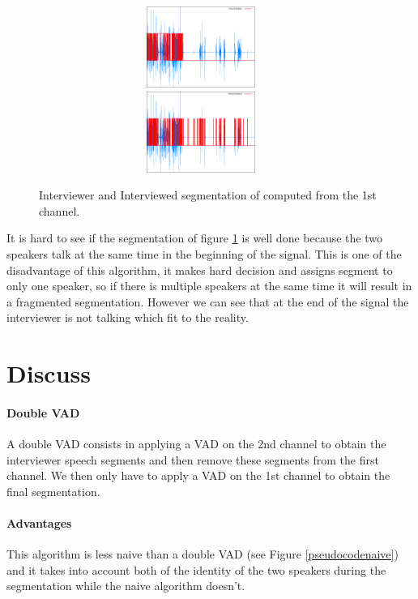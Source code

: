 \documentclass{techrep} %
\begin{document}
\begin{figure}[H]
  \centering \includegraphics[width=400px,height=100px]{interviewer}
  \centering \includegraphics[width=400px,height=100px]{interviewed}
  \caption{Interviewer and Interviewed segmentation of computed from the 1st channel.}
  \label{sigc2}
\end{figure}

It is hard to see if the segmentation of figure \ref{sigc2} is well
done because the two speakers talk at the same time in the beginning
of the signal. This is one of the disadvantage of this algorithm, it
makes hard decision and assigns segment to only one speaker, so if
there is multiple speakers at the same time it will result in a
fragmented segmentation. However we can see that at the end of the signal
the interviewer is not talking which fit to the reality.

\section{Discuss}

\paragraph{Double VAD}
A double VAD consists in applying a VAD on the 2nd channel to obtain
the interviewer speech segments and then remove these segments from
the first channel. We then only have to apply a VAD on the 1st channel
to obtain the final segmentation.

\paragraph{Advantages}
This algorithm is less naive than a double VAD (see Figure
\ref{pseudocodenaive}) and it takes into account both of the identity
of the two speakers during the segmentation while the naive algorithm
doesn't.
\end{document}
